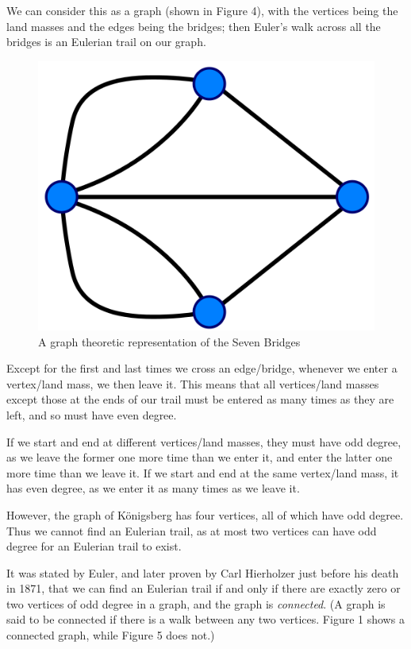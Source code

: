 We can consider this as a graph (shown in Figure 4), with the vertices being the land masses and the edges being the bridges; then Euler's walk across all the bridges is an Eulerian trail on our graph.



\begin{figure}[h]
\centering
\includegraphics{Konigsberggraph.png}
\caption{A graph theoretic representation of the Seven Bridges}
\label{Konigsberggraph}
\end{figure}



Except for the first and last times we cross an edge/bridge, whenever we enter a vertex/land mass, we then leave it. This means that all vertices/land masses except those at the ends of our trail must be entered as many times as they are left, and so must have even degree.

If we start and end at different vertices/land masses, they must have odd degree, as we leave the former one more time than we enter it, and enter the latter one more time than we leave it. If we start and end at the same vertex/land mass, it has even degree, as we enter it as many times as we leave it.

However, the graph of K\"onigsberg has four vertices, all of which have odd degree. Thus we cannot find an Eulerian trail, as at most two vertices can have odd degree for an Eulerian trail to exist.

It was stated by Euler, and later proven by Carl Hierholzer just before his death in 1871, that we can find an Eulerian trail if and only if there are exactly zero or two vertices of odd degree in a graph, and the graph is \textit{connected}. (A graph is said to be connected if there is a walk between any two vertices. Figure 1 shows a connected graph, while Figure 5 does not.)



